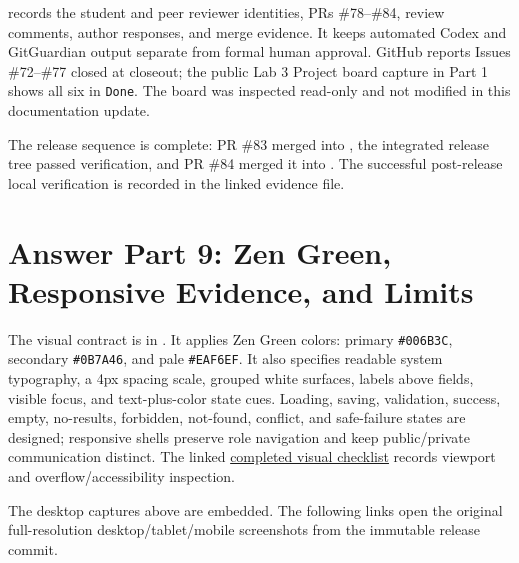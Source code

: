 \documentclass[10pt,a4paper]{article}
\begin{document}
\href{https://github.com/ovenmakemeheat/toktickit/blob/main/docs/lab-03/reviewer.md}{}
records the student and peer reviewer identities, PRs \#78--\#84, review
comments, author responses, and merge evidence. It keeps automated Codex and
GitGuardian output separate from formal human approval. GitHub reports Issues
\#72--\#77 closed at closeout; the public Lab 3 Project board capture in Part 1
shows all six in \texttt{Done}. The board was inspected read-only and not
modified in this documentation update.

The release sequence is complete: PR \#83 merged into , the
integrated release tree passed verification, and PR \#84 merged it into
. The successful post-release local verification is recorded in the
linked evidence file.

\section{Answer Part 9: Zen Green, Responsive Evidence, and Limits}

The visual contract is in
\href{https://github.com/ovenmakemeheat/toktickit/blob/eddafe67d6fd8d742b98d4673a731b25540cc57d/docs/lab-03/ui-spec.md}{}.
It applies Zen Green colors: primary \texttt{\#006B3C}, secondary
\texttt{\#0B7A46}, and pale \texttt{\#EAF6EF}. It also specifies readable
system typography, a 4px spacing scale, grouped white surfaces, labels above
fields, visible focus, and text-plus-color state cues.
Loading, saving, validation, success, empty, no-results, forbidden, not-found,
conflict, and safe-failure states are designed; responsive shells preserve role
navigation and keep public/private communication distinct. The linked
\href{https://github.com/ovenmakemeheat/toktickit/blob/eddafe67d6fd8d742b98d4673a731b25540cc57d/docs/lab-03/evidence/visual-inspection-checklist.md}{completed visual checklist}
records viewport and overflow/accessibility inspection.

The desktop captures above are embedded. The following links open the original
full-resolution desktop/tablet/mobile screenshots from the immutable release
commit.
\end{document}
